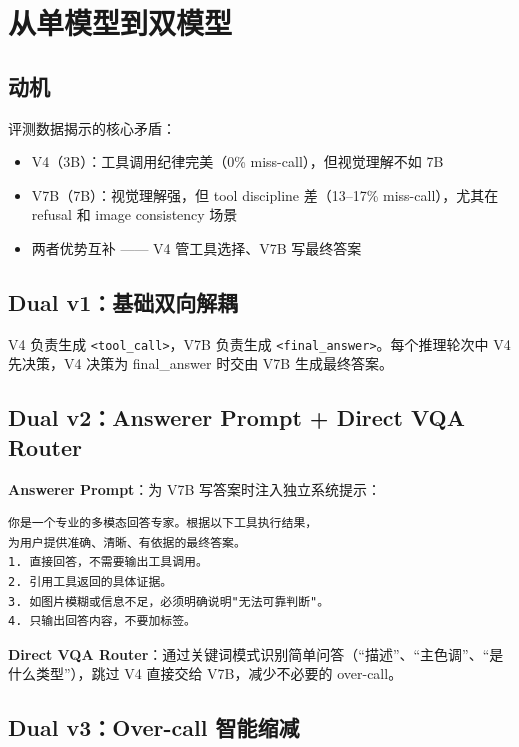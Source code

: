 \documentclass[12pt,a4paper]{ctexart}
\begin{document}
\section{从单模型到双模型}

\subsection{动机}

评测数据揭示的核心矛盾：

\begin{itemize}
  \item V4（3B）：工具调用纪律完美（0\% miss-call），但视觉理解不如 7B
  \item V7B（7B）：视觉理解强，但 tool discipline 差（13--17\% miss-call），尤其在 refusal 和 image consistency 场景
  \item 两者优势互补 —— V4 管工具选择、V7B 写最终答案
\end{itemize}

\subsection{Dual v1：基础双向解耦}

V4 负责生成 \texttt{<tool\_call>}，V7B 负责生成 \texttt{<final\_answer>}。每个推理轮次中 V4 先决策，V4 决策为 final\_answer 时交由 V7B 生成最终答案。

\subsection{Dual v2：Answerer Prompt + Direct VQA Router}

\textbf{Answerer Prompt}：为 V7B 写答案时注入独立系统提示：
\begin{lstlisting}
你是一个专业的多模态回答专家。根据以下工具执行结果，
为用户提供准确、清晰、有依据的最终答案。
1. 直接回答，不需要输出工具调用。
2. 引用工具返回的具体证据。
3. 如图片模糊或信息不足，必须明确说明"无法可靠判断"。
4. 只输出回答内容，不要加标签。
\end{lstlisting}

\textbf{Direct VQA Router}：通过关键词模式识别简单问答（``描述''、``主色调''、``是什么类型''），跳过 V4 直接交给 V7B，减少不必要的 over-call。

\subsection{Dual v3：Over-call 智能缩减}
\end{document}

